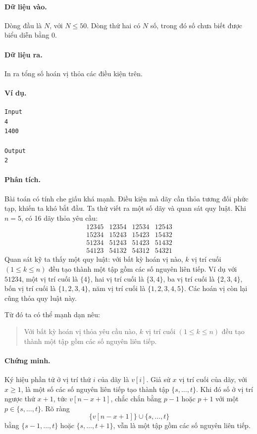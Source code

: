 \documentclass[11pt]{article}
\begin{document}
\paragraph{Dữ liệu vào.}
Dòng đầu là \(N\), với \(N\le 50\). Dòng thứ hai có \(N\) số, trong đó số
chưa biết được biểu diễn bằng 0.

\paragraph{Dữ liệu ra.}
In ra tổng số hoán vị thỏa các điều kiện trên.

\paragraph{Ví dụ.}
\begin{verbatim}
Input
4
1400

Output
2
\end{verbatim}

\paragraph{Phân tích.}
Bài toán có tính che giấu khá mạnh. Điều kiện mà dãy cần thỏa tương đối phức
tạp, khiến ta khó bắt đầu. Ta thử viết ra một số dãy và quan sát quy luật.
Khi \(n=5\), có 16 dãy thỏa yêu cầu:
\[
\begin{array}{llll}
12345 & 12354 & 12534 & 12543\\
15234 & 15243 & 15423 & 15432\\
51234 & 51243 & 51423 & 51432\\
54123 & 54132 & 54312 & 54321
\end{array}
\]
Quan sát kỹ ta thấy một quy luật: với bất kỳ hoán vị nào, \(k\) vị trí cuối
\((1\le k\le n)\) đều tạo thành một tập gồm các số nguyên liên tiếp. Ví dụ
với \(51234\), một vị trí cuối là \(\{4\}\), hai vị trí cuối là \(\{3,4\}\),
ba vị trí cuối là \(\{2,3,4\}\), bốn vị trí cuối là \(\{1,2,3,4\}\), năm vị
trí cuối là \(\{1,2,3,4,5\}\). Các hoán vị còn lại cũng thỏa quy luật này.

Từ đó ta có thể mạnh dạn nêu:

\begin{quote}
 Với bất kỳ hoán vị thỏa yêu cầu nào, \(k\) vị trí cuối
\((1\le k\le n)\) đều tạo thành một tập gồm các số nguyên liên tiếp.
\end{quote}

\paragraph{Chứng minh.}
Ký hiệu phần tử ở vị trí thứ \(i\) của dãy là \(v[i]\). Giả sử \(x\) vị trí
cuối của dãy, với \(x\ge 1\), là một số các số nguyên liên tiếp tạo thành tập
\(\{s,\ldots,t\}\). Khi đó số ở vị trí ngược thứ \(x+1\), tức
\(v[n-x+1]\), chắc chắn bằng \(p-1\) hoặc \(p+1\) với một
\(p\in\{s,\ldots,t\}\). Rõ ràng
\[
  \{v[n-x+1]\}\cup\{s,\ldots,t\}
\]
bằng \(\{s-1,\ldots,t\}\) hoặc \(\{s,\ldots,t+1\}\), vẫn là một tập gồm các
số nguyên liên tiếp.
\end{document}
